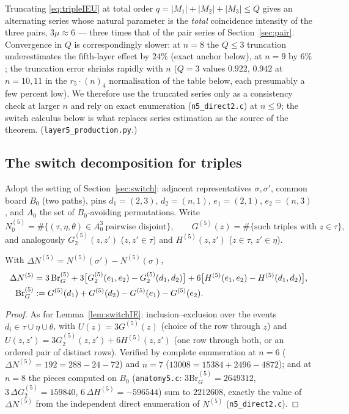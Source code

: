 \begin{remark}
Truncating \eqref{eq:tripleIEU} at total order
$q=|M_1|+|M_2|+|M_3|\le Q$ gives an alternating series whose natural
parameter is the \emph{total} coincidence intensity of the three pairs,
$3\mu\approx6$ --- three times that of the pair series of
Section~\ref{sec:pair}.  Convergence in $Q$ is correspondingly slower:
at $n=8$ the $Q\le3$ truncation underestimates the fifth-layer effect
by $24\%$ (exact anchor below), at $n=9$ by $6\%$; the truncation error
shrinks rapidly with $n$ ($Q=3$ values $0.922$, $0.942$ at $n=10,11$ in
the $r_5\cdot(n)_4$ normalisation of the table below, each presumably a
few percent low).  We therefore use the truncated series only as a
consistency check at larger $n$ and rely on exact enumeration
(\texttt{n5\_direct2.c}) at $n\le9$; the switch calculus below is what
replaces series estimation as the source of the theorem.
(\texttt{layer5\_production.py}.)
\end{remark}

\subsection{The switch decomposition for triples}

Adopt the setting of Section~\ref{sec:switch}: adjacent representatives
$\sigma,\sigma'$, common board $B_0$ (two paths), pins
$d_1=(2,3)$, $d_2=(n,1)$, $e_1=(2,1)$, $e_2=(n,3)$, and $A_0$ the set of
$B_0$-avoiding permutations.  Write
\[
N^{(5)}_0=\#\{(\tau,\eta,\theta)\in A_0^3\ \text{pairwise disjoint}\},
\qquad
G^{(5)}(z)=\#\{\text{such triples with }z\in\tau\},
\]
and analogously $G_2^{(5)}(z,z')$ ($z,z'\in\tau$) and $H^{(5)}(z,z')$
($z\in\tau$, $z'\in\eta$).

\begin{lemma}\label{lem:switchIE5}
With $\Delta N^{(5)}=N^{(5)}(\sigma')-N^{(5)}(\sigma)$,
\begin{align}
\Delta N^{(5)}
&=3\,\mathrm{Br}^{(5)}_G
+3\bigl[G_2^{(5)}(e_1,e_2)-G_2^{(5)}(d_1,d_2)\bigr]
+6\bigl[H^{(5)}(e_1,e_2)-H^{(5)}(d_1,d_2)\bigr],
\label{eq:switchIE5}\\
\mathrm{Br}^{(5)}_G&:=G^{(5)}(d_1)+G^{(5)}(d_2)-G^{(5)}(e_1)-G^{(5)}(e_2).
\notag
\end{align}
\end{lemma}

\begin{proof}
As for Lemma~\ref{lem:switchIE}: inclusion--exclusion over the events
$d_i\in\tau\cup\eta\cup\theta$, with $U(z)=3G^{(5)}(z)$ (choice of the
row through $z$) and $U(z,z')=3G_2^{(5)}(z,z')+6H^{(5)}(z,z')$ (one row
through both, or an ordered pair of distinct rows).  Verified by
complete enumeration at $n=6$
($\Delta N^{(5)}=192=288-24-72$) and $n=7$
($13008=15384+2496-4872$); and at $n=8$ the pieces computed on $B_0$
(\texttt{anatomy5.c}: $3\mathrm{Br}^{(5)}_G=2649312$,
$3\,\Delta G_2^{(5)}=159840$, $6\,\Delta H^{(5)}=-596544$) sum to
$2212608$, exactly the value of $\Delta N^{(5)}$ from the independent
direct enumeration of $N^{(5)}$ (\texttt{n5\_direct2.c}).
\end{proof}

